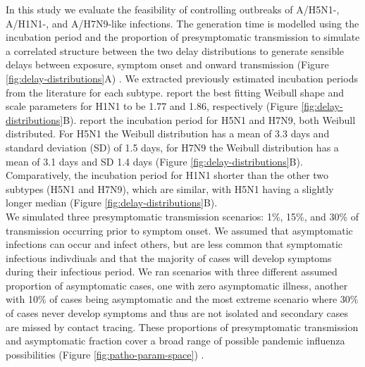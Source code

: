 \documentclass{article}
\begin{document}
In this study we evaluate the feasibility of controlling outbreaks of A/H5N1-, A/H1N1-, and A/H7N9-like infections. The generation time is modelled using the incubation period and the proportion of presymptomatic transmission to simulate a correlated structure between the two delay distributions to generate sensible delays between exposure, symptom onset and onward transmission (Figure \ref{fig:delay-distributions}A) \citep{hellewellFeasibilityControllingCOVID192020, lintonCorrelationTimesSARSCoV22022}. We extracted previously estimated incubation periods from the literature for each subtype. \cite{nishiuraEstimationIncubationPeriod2011} report the best fitting Weibull shape and scale parameters for H1N1 to be 1.77 and 1.86, respectively (Figure \ref{fig:delay-distributions}B). \cite{cowlingComparativeEpidemiologyHuman2013} report the incubation period for H5N1 and H7N9, both Weibull distributed. For H5N1 the Weibull distribution has a mean of 3.3 days and standard deviation (SD) of 1.5 days, for H7N9 the Weibull distribution has a mean of 3.1 days and SD 1.4 days \citep{cowlingComparativeEpidemiologyHuman2013} (Figure \ref{fig:delay-distributions}B). Comparatively, the incubation period for H1N1 shorter than the other two subtypes (H5N1 and H7N9), which are similar, with H5N1 having a slightly longer median (Figure \ref{fig:delay-distributions}B). \\

We simulated three presymptomatic transmission scenarios: 1\%, 15\%, and 30\% of transmission occurring prior to symptom onset. We assumed that asymptomatic infections can occur and infect others, but are less common that symptomatic infectious indivdiuals and that the majority of cases will develop symptoms during their infectious period.  We ran scenarios with three different assumed proportion of asymptomatic cases, one with zero asymptomatic illness, another with 10\% of cases being asymptomatic and the most extreme scenario where 30\% of cases never develop symptoms and thus are not isolated and secondary cases are missed by contact tracing. These proportions of presymptomatic transmission and asymptomatic fraction cover a broad range of possible pandemic influenza possibilities (Figure \ref{fig:patho-param-space}) \citep{lesslerOutbreak2009Pandemic2009, xuSerologicalInvestigationSubclinical2013, montgomeryRoleAsymptomaticInfections2024, gargHighlyPathogenicAvian2025}. \\
\end{document}
